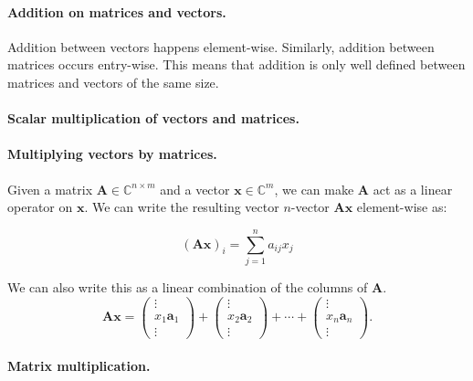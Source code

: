 \documentclass[12pt]{article}
\newcommand{\bbC}{\mathbb{C}}
\renewcommand{\vec}[1]{\mathbf{#1}}
\theoremstyle{definition}
\theoremstyle{remark}
\numberwithin{equation}{section}
\begin{document}
\paragraph{Addition on matrices and vectors.}
Addition between vectors happens element-wise. Similarly, addition between matrices occurs entry-wise. This means that addition is only well defined between matrices and vectors of the same size.

\paragraph{Scalar multiplication of vectors and matrices.}

\paragraph{Multiplying vectors by matrices.}

Given a matrix $\vec{A} \in \bbC^{n\times m}$ and a vector $\vec{x} \in \bbC^{m}$, we can make $\vec{A}$ act as a linear operator on $\vec{x}$. We can write the resulting vector $n$-vector $\vec{Ax}$ element-wise as:

\begin{equation}
  (\vec{Ax})_{i} = \sum_{j=1}^{n} a_{ij}x_j 
\end{equation}

We can also write this as a linear combination of the columns of $\vec{A}$.
\begin{equation}
  \vec{Ax} = \begin{pmatrix}
    \vdots \\
    x_1\vec{a}_1\\
    \vdots
  \end{pmatrix} + 
  \begin{pmatrix}
    \vdots \\
    x_2\vec{a}_2\\
    \vdots
  \end{pmatrix} + \cdots +
  \begin{pmatrix}
    \vdots \\
    x_n\vec{a}_n\\
    \vdots
  \end{pmatrix}.
\end{equation}

\paragraph{Matrix multiplication.}
\end{document}
